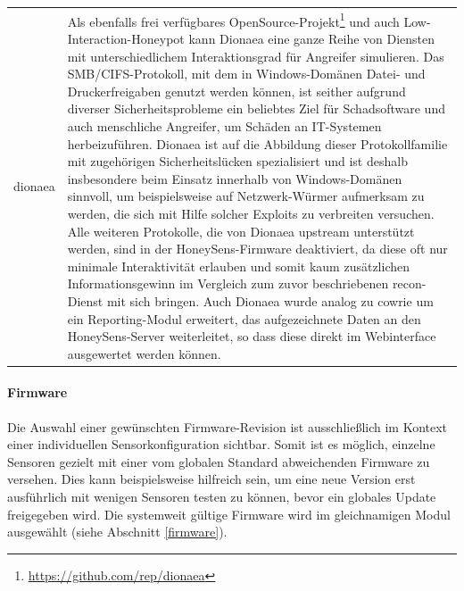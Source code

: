 \documentclass[12pt]{article}
\begin{document}
\begin{longtable}[h]{|l|l|}
\begin{minipage}[h]{0.85\linewidth}
					\vspace{0.5\baselineskip}\end{minipage}\\\hline
	dionaea & \begin{minipage}[h]{0.85\linewidth}\vspace{0.5\baselineskip}
				Als ebenfalls frei verfügbares OpenSource-Projekt\footnote{\url{https://github.com/rep/dionaea}} und auch Low-Interaction-Honeypot kann Dionaea eine ganze Reihe von Diensten mit unterschiedlichem Interaktionsgrad für Angreifer simulieren. Das SMB/CIFS-Protokoll, mit dem in Windows-Domänen Datei- und Druckerfreigaben genutzt werden können, ist seither aufgrund diverser Sicherheitsprobleme ein beliebtes Ziel für Schadsoftware und auch menschliche Angreifer, um Schäden an IT-Systemen herbeizuführen. Dionaea ist auf die Abbildung dieser Protokollfamilie mit zugehörigen Sicherheitslücken spezialisiert und ist deshalb insbesondere beim Einsatz innerhalb von Windows-Domänen sinnvoll, um beispielsweise auf Netzwerk-Würmer aufmerksam zu werden, die sich mit Hilfe solcher Exploits zu verbreiten versuchen. Alle weiteren Protokolle, die von Dionaea upstream unterstützt werden, sind in der HoneySens-Firmware deaktiviert, da diese oft nur minimale Interaktivität erlauben und somit kaum zusätzlichen Informationsgewinn im Vergleich zum zuvor beschriebenen recon-Dienst mit sich bringen. Auch Dionaea wurde analog zu cowrie um ein Reporting-Modul erweitert, das aufgezeichnete Daten an den HoneySens-Server weiterleitet, so dass diese direkt im Webinterface ausgewertet werden können.
					\vspace{0.5\baselineskip}\end{minipage}\\\hline

\end{longtable}

\paragraph{Firmware}
Die Auswahl einer gewünschten Firmware-Revision ist ausschließlich im Kontext einer individuellen Sensorkonfiguration sichtbar. Somit ist es möglich, einzelne Sensoren gezielt mit einer vom globalen Standard abweichenden Firmware zu versehen. Dies kann beispielsweise hilfreich sein, um eine neue Version erst ausführlich mit wenigen Sensoren testen zu können, bevor ein globales Update freigegeben wird. Die systemweit gültige Firmware wird im gleichnamigen Modul ausgewählt (siehe Abschnitt \ref{firmware}).
\end{document}
